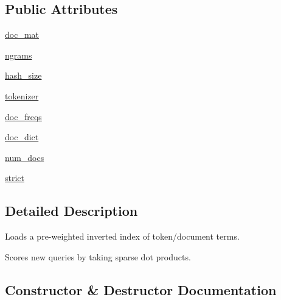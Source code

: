 \subsection*{Public Attributes}
\begin{DoxyCompactItemize}
\item 
\hyperlink{classparlai_1_1agents_1_1tfidf__retriever_1_1tfidf__doc__ranker_1_1TfidfDocRanker_ad36148d59e1bce7e5904899316317c61}{doc\+\_\+mat}
\item 
\hyperlink{classparlai_1_1agents_1_1tfidf__retriever_1_1tfidf__doc__ranker_1_1TfidfDocRanker_ab3d7c309a8de8cc664192169d95d9c87}{ngrams}
\item 
\hyperlink{classparlai_1_1agents_1_1tfidf__retriever_1_1tfidf__doc__ranker_1_1TfidfDocRanker_add0942063ebbb05487feadbe9b421d56}{hash\+\_\+size}
\item 
\hyperlink{classparlai_1_1agents_1_1tfidf__retriever_1_1tfidf__doc__ranker_1_1TfidfDocRanker_ae125548ea43894545541ae71fdc35ff7}{tokenizer}
\item 
\hyperlink{classparlai_1_1agents_1_1tfidf__retriever_1_1tfidf__doc__ranker_1_1TfidfDocRanker_a11677b2692fb3311eef1458762265ae9}{doc\+\_\+freqs}
\item 
\hyperlink{classparlai_1_1agents_1_1tfidf__retriever_1_1tfidf__doc__ranker_1_1TfidfDocRanker_af9cda5d944e01e08c45d0b3bbe6cb1ac}{doc\+\_\+dict}
\item 
\hyperlink{classparlai_1_1agents_1_1tfidf__retriever_1_1tfidf__doc__ranker_1_1TfidfDocRanker_a5fe0df360e9868ba2ce073ffc49a7d1b}{num\+\_\+docs}
\item 
\hyperlink{classparlai_1_1agents_1_1tfidf__retriever_1_1tfidf__doc__ranker_1_1TfidfDocRanker_a8c3f9e75f2a3b3ae127e87f25600c7fb}{strict}
\end{DoxyCompactItemize}


\subsection{Detailed Description}
\begin{DoxyVerb}Loads a pre-weighted inverted index of token/document terms.

Scores new queries by taking sparse dot products.
\end{DoxyVerb}
 

\subsection{Constructor \& Destructor Documentation}
\mbox{\label{classparlai_1_1agents_1_1tfidf__retriever_1_1tfidf__doc__ranker_1_1TfidfDocRanker_a8bd42fd68fe2d18965bc4ad3b8940ba8}} 
